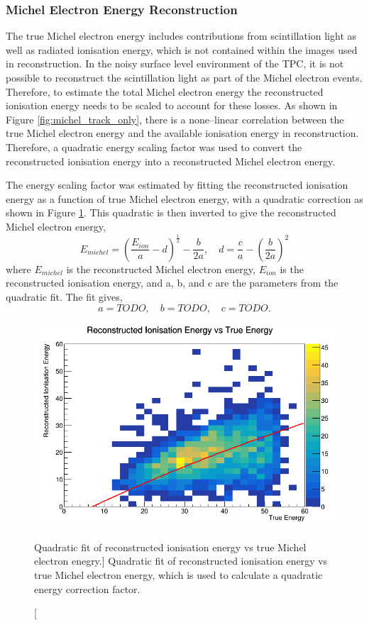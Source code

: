\subsubsection{Michel Electron Energy Reconstruction}

The true Michel electron energy includes contributions from scintillation light
as well as radiated ionisation energy, which is not contained within the images
used in reconstruction. In the noisy surface level environment of the
\protodune{} TPC, it is not possible to reconstruct the scintillation light as
part of the Michel electron events. Therefore, to estimate the total Michel 
electron energy the reconstructed ionisation energy needs to be scaled to 
account for these losses. As shown in Figure \ref{fig:michel_track_only},
there is a none--linear correlation between the true Michel electron energy 
and the available ionisation energy in reconstruction. Therefore, a quadratic 
energy scaling factor was used to convert the reconstructed ionisation energy 
into a reconstructed Michel electron energy. 

The energy scaling factor was estimated by fitting the reconstructed ionisation
energy as a function of true Michel electron energy, with a quadratic 
correction as shown in Figure \ref{fig:quadratic_fit}. This quadratic is then 
inverted to give the reconstructed Michel electron energy,
\begin{equation}
	E_{michel} = \left( \frac{E_{ion}}{a} - d \right)^{\frac{1}{2}} - \frac{b}{2a},
	\quad d = \frac{c}{a} - \left( \frac{b}{2a} \right)^2 
\end{equation}
where $E_{michel}$ is the reconstructed Michel electron energy, $E_{ion}$ is the
reconstructed ionisation energy, and a, b, and c are the parameters from the
quadratic fit. The fit gives,
\begin{equation}
	a = TODO, \quad b = TODO, \quad c = TODO.
\end{equation}
\begin{figure}
	\centering
	\includegraphics[width=\textwidth]{figures/reco_v_true.png}
	\caption
	[Quadratic fit of reconstructed ionisation energy vs true Michel electron
	enegry.]
	{Quadratic fit of reconstructed ionisation energy vs true Michel electron
	energy, which is used to calculate a quadratic energy correction factor.}
	\label{fig:quadratic_fit}
\end{figure}

